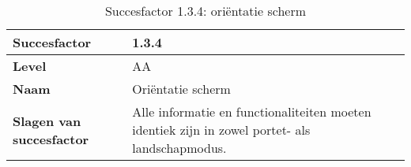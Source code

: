 \begin{table}
    \centering
    \caption{Succesfactor 1.3.4: oriëntatie scherm }
    \hspace*{-1cm}\begin{tabular}{|l|p{12cm}|} 
        \hline
        \textbf{Succesfactor}                 & 1.3.4                                                                                                                                                                                                                                                                                                                                                                                                                                                                                                             \\ 
        \hline
        \textbf{Level}                        & AA                                                                                                                                                                                                                                                                                                                                                                                                                                                                                                                 \\ 
        \hline
        \textbf{Naam}                         & Oriëntatie scherm~                                                                                                                                                                                                                                                                                                                                                                                                                                                                                      \\ 
        \hline
        \textbf{Slagen van succesfactor}      & Alle informatie en functionaliteiten moeten  identiek zijn in zowel portet- als landschapmodus.                                                                                                                                                                                                                                                                                                                                                            \\ 

\end{tabular}
\end{table}
